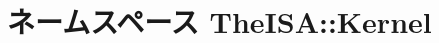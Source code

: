 \hypertarget{namespaceTheISA_1_1Kernel}{
\section{ネームスペース TheISA::Kernel}
\label{namespaceTheISA_1_1Kernel}
}
